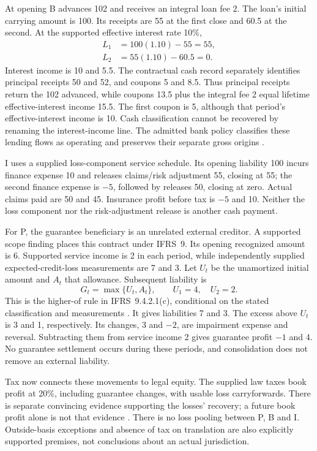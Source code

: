 At opening B advances 102 and receives an integral loan fee 2. The loan's initial
carrying amount is 100. Its receipts are 55 at the first close and 60.5 at the
second. At the supported effective interest rate 10\%,
\begin{align}
 L_1&=100(1.10)-55=55,\\
 L_2&=55(1.10)-60.5=0.
\end{align}
Interest income is 10 and 5.5. The contractual cash record separately identifies
principal receipts 50 and 52, and coupons 5 and 8.5. Thus principal receipts return
the 102 advanced, while coupons 13.5 plus the integral fee 2 equal lifetime
effective-interest income 15.5. The first coupon is 5, although that period's
effective-interest income is 10. Cash classification cannot be recovered by
renaming the interest-income line. The admitted bank policy classifies these
lending flows as operating and preserves their separate gross origins
\citep[IAS~7.14--15,31--33; IFRS~9.B 5.4.1--B 5.4.4]{eu20231803}.

I uses a supplied loss-component service schedule. Its opening
liability 100 incurs finance expense 10 and releases claims/risk adjustment 55,
closing at 55; the second finance expense is \(-5\), followed by releases 50,
closing at zero. Actual claims paid are 50 and 45. Insurance profit before tax
is \(-5\) and 10. Neither the loss component nor the risk-adjustment release is
another cash payment.

For P, the guarantee beneficiary is an unrelated external creditor. A supported
scope finding places this contract under IFRS~9. Its opening recognized amount
is 6. Supported service income is 2 in each period, while independently supplied
expected-credit-loss measurements are 7 and 3. Let \(U_t\) be the unamortized
initial amount and \(A_t\) that allowance. Subsequent liability is
\begin{equation}
 G_t=\max\{U_t,A_t\},\qquad U_1=4,\quad U_2=2.
 \label{eq:sector-guarantee-higher-of}
\end{equation}
This is the higher-of rule in IFRS~9.4.2.1(c), conditional on the stated
classification and measurements \citep{eu20231803}. It gives liabilities 7
and 3. The excess above \(U_t\) is 3 and 1, respectively. Its changes, 3 and
\(-2\), are impairment expense and reversal. Subtracting them from service
income 2 gives guarantee profit \(-1\) and 4. No guarantee settlement occurs
during these periods, and consolidation does not remove an external liability.

Tax now connects these movements to legal equity. The supplied law taxes book
profit at 20\%, including guarantee changes, with usable loss carryforwards.
There is separate convincing evidence supporting the losses' recovery; a
future book profit alone is not that evidence
\citep[IAS~12.34--36,46--47]{eu20231803}. There is no loss pooling between P,
B and I. Outside-basis exceptions and absence of tax on translation are also
explicitly supported premises, not conclusions about an actual jurisdiction.

